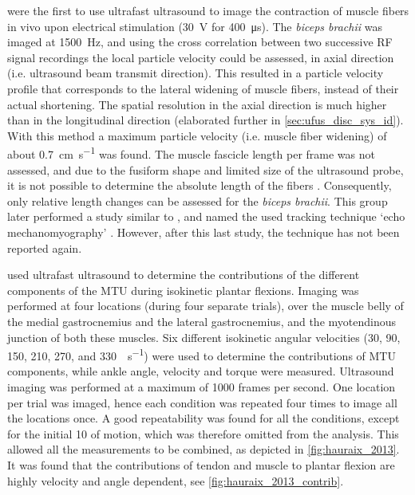 \citet{deffieux_ultrafast_2006} were the first to use ultrafast ultrasound to image the contraction of muscle fibers in vivo upon electrical stimulation (\SI{30}{\volt} for \SI{400}{\micro\second}). The \textit{biceps brachii} was imaged at \SI{1500}{\hertz}, and using the cross correlation between two successive RF signal recordings the local particle velocity could be assessed, in axial direction (i.e. ultrasound beam transmit direction). This resulted in a particle velocity profile that corresponds to the lateral widening of muscle fibers, instead of their actual shortening. The spatial resolution in the axial direction is much higher than in the longitudinal direction (elaborated further in \autoref{sec:ufus_disc_sys_id}). With this method a maximum particle velocity (i.e. muscle fiber widening) of about \SI{0.7}{\centi\meter\per\second} was found. The muscle fascicle length per frame was not assessed, and due to the fusiform shape and limited size of the ultrasound probe, it is not possible to determine the absolute length of the fibers \cite{hodges_measurement_2003}. Consequently, only relative length changes can be assessed for the \textit{biceps brachii}. This group later performed a study similar to \cite{deffieux_ultrafast_2006}, and named the used tracking technique `echo mechanomyography' \cite{deffieux_assessment_2008}. However, after this last study, the technique has not been reported again. 


\citet{hauraix_shortening_2013} used ultrafast ultrasound to determine the contributions of the different components of the MTU during isokinetic plantar flexions. Imaging was performed at four locations (during four separate trials), over the muscle belly of the medial gastrocnemius and the lateral gastrocnemius, and the myotendinous junction of both these muscles. Six different isokinetic angular velocities (30, 90, 150, 210, 270, and \SI{330}{\deg\per\second}) were used to determine the contributions of MTU components, while ankle angle, velocity and torque were measured. Ultrasound imaging was performed at a maximum of 1000 frames per second. One location per trial was imaged, hence each condition was repeated four times to image all the locations once. A good repeatability was found for all the conditions, except for the initial \SI{10}{\deg} of motion, which was therefore omitted from the analysis. This allowed all the measurements to be combined, as depicted in \autoref{fig:hauraix_2013}. It was found that the contributions of tendon and muscle to plantar flexion are highly velocity and angle dependent, see \autoref{fig:hauraix_2013_contrib}. 


